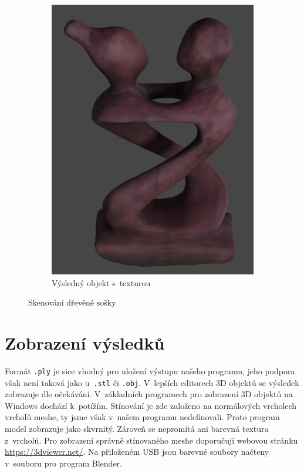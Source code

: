 \documentclass[12pt]{report}			%
\begin{document}
\begin{figure}[h]
\begin{subfigure}[b]{0.3\textwidth}
                        \includegraphics[width=\textwidth]{images/sochaObrazBarevny.png}
                        \caption{Výsledný objekt s~texturou}
                    \end{subfigure}
                    \caption{Skenování dřevěné sošky}
                \end{figure}

            \section{Zobrazení výsledků}

                Formát \verb|.ply| je sice vhodný pro uložení výstupu našeho programu, jeho podpora však není taková jako u~\verb|.stl| či \verb|.obj|. V~lepších editorech 3D objektů se výsledek zobrazuje dle očekávání. V~základních programech pro zobrazení 3D objektů na Windows dochází k~potížím. Stínování je zde založeno na normálových vrcholech vrcholů meshe, ty jsme však v~našem programu nedefinovali. Proto program model zobrazuje jako skvrnitý. Zároveň se nepromítá ani barevná textura z~vrcholů. Pro zobrazení správně stínovaného meshe doporučuji webovou stránku \url{https://3dviewer.net/}. Na přiloženém USB jsou barevné soubory načteny v~souboru pro program Blender.
\end{document}
